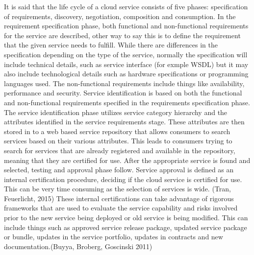 \documentclass{article}
\begin{document}
It is said that the life cycle of a cloud service consists of five phases: specification of requirements, discovery, negotiation, composition and consumption. In the requirement specification phase, both functional and non-functional requirements for the service are described, other way to say this is to define the requirement that the given service needs to fulfill. While there are differences in the specification depending on the type of the service, normally the specification will include technical details, such as service interface (for exmple WSDL) but it may also include technological details such as hardware specifications or programming languages used. The non-functional requirements include things like availability, performance and security. Service identification is based on both the functional and non-functional requirements specified in the requirements specification phase. The service identification phase utilizes service category hierarchy and the attributes identified in the service requirements stage. These attributes are then stored in to a web based service repository that allows consumers to search services based on their various attributes. This leads to consumers trying to search for services that are already registered and available in the repository, meaning that they are certified for use. After the appropriate service is found and selected, testing and approval phase follow. Service approval is defined as an internal certification procedure, deciding if the cloud service is certified for use. This can be very time consuming as the selection of services is wide. (Tran, Feuerlicht, 2015) These internal certifications can take advantage of rigorous frameworks that are used to evaluate the service capability and risks involved prior to the new service being deployed or old service is being modified. This can include things such as approved service release package, updated service package or bundle, updates in the service portfolio, updates in contracts and new documentation.(Buyya, Broberg, Goscinski 2011) 
\par
\end{document}
